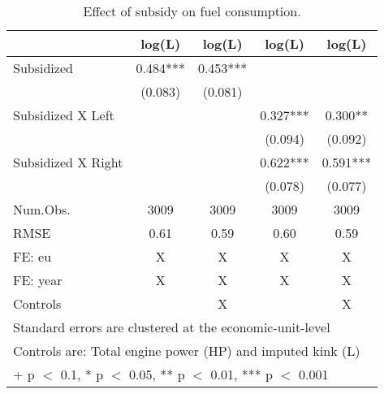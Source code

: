 \begin{table}

\caption{\label{tab:}Effect of subsidy on fuel consumption.}
\centering
\begin{tabular}[t]{lcccc}
\toprule
  & log(L) & log(L)  & log(L)   & log(L)   \\
\midrule
Subsidized & \num{0.484}*** & \num{0.453}*** &  & \\
 & (\num{0.083}) & (\num{0.081}) &  & \\
Subsidized X Left &  &  & \num{0.327}*** & \num{0.300}**\\
 &  &  & (\num{0.094}) & (\num{0.092})\\
Subsidized X Right &  &  & \num{0.622}*** & \num{0.591}***\\
 &  &  & (\num{0.078}) & (\num{0.077})\\
\midrule
Num.Obs. & \num{3009} & \num{3009} & \num{3009} & \num{3009}\\
RMSE & \num{0.61} & \num{0.59} & \num{0.60} & \num{0.59}\\
FE: eu & X & X & X & X\\
FE: year & X & X & X & X\\
Controls &  & X &  & X\\
\bottomrule
\multicolumn{5}{l}{\rule{0pt}{1em}Standard errors are clustered at the economic-unit-level}\\
\multicolumn{5}{l}{\rule{0pt}{1em}Controls are: Total engine power (HP) and imputed kink (L)}\\
\multicolumn{5}{l}{\rule{0pt}{1em}+ p $<$ 0.1, * p $<$ 0.05, ** p $<$ 0.01, *** p $<$ 0.001}\\
\end{tabular}
\end{table}
